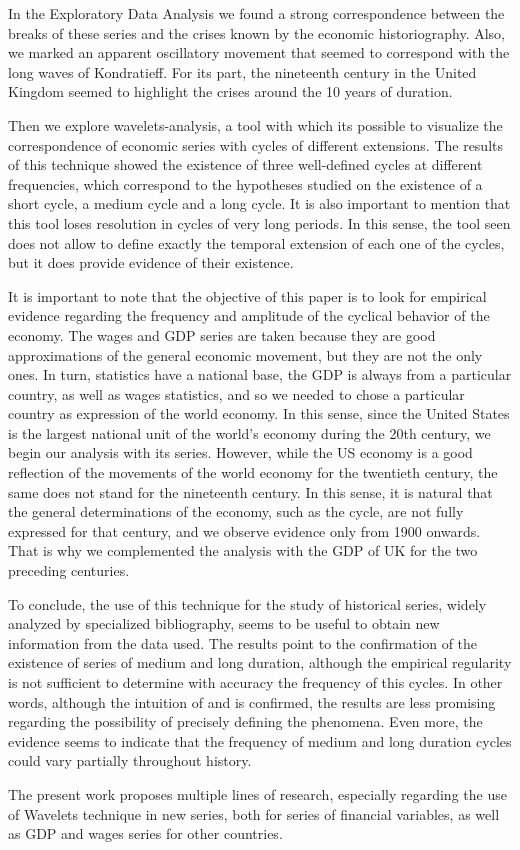 \documentclass[a4paper]{article}
\begin{document}
In the Exploratory Data Analysis we found a strong correspondence between the breaks of these series and the crises known by the economic historiography. Also, we marked an apparent oscillatory movement that seemed to correspond with the long waves of Kondratieff. For its part, the nineteenth century in the United Kingdom seemed to highlight the crises around the 10 years of duration.

Then we explore wavelets-analysis, a tool with which its possible to visualize the correspondence of economic series with cycles of different extensions. The results of this technique showed the existence of three well-defined cycles at different frequencies, which correspond to the hypotheses studied on the existence of a short cycle, a medium cycle and a long cycle. It is also important to mention that this tool loses resolution in cycles of very long periods. In this sense, the tool seen does not allow to define exactly the temporal extension of each one of the cycles, but it does provide evidence of their existence.

It is important to note that the objective of this paper is to look for empirical evidence regarding the frequency and amplitude of the cyclical behavior of the economy. The wages and GDP series are taken because they are good approximations of the general economic movement, but they are not the only ones. In turn, statistics have a national base, the GDP is always from a particular country, as well as wages statistics, and so we needed to chose a particular country as expression of the world economy. In this sense, since the United States is the largest national unit of the world's economy during the 20th century, we begin our analysis with its series. However, while the US economy is a good reflection of the movements of the world economy for the twentieth century, the same does not stand for the nineteenth century. In this sense, it is natural that the general determinations of the economy, such as the cycle, are not fully expressed for that century, and we observe evidence only from 1900 onwards. That is why we complemented the analysis with the GDP of UK for the two preceding centuries.

To conclude, the use of this technique for the study of historical series, widely analyzed by specialized bibliography, seems to be useful to obtain new information from the data used. The results point to the confirmation of the existence of series of medium and long duration, although the empirical regularity is not sufficient to determine with accuracy the frequency of this cycles. In other words, although the intuition of \cite{kuznets1930secular} and \cite{kondratieff1979long} is confirmed, the results are less promising regarding the possibility of precisely defining the phenomena. Even more, the evidence seems to indicate that the frequency of medium and long duration cycles could vary partially throughout history.

The present work proposes multiple lines of research, especially regarding the use of Wavelets technique in new series, both for series of financial variables, as well as GDP and wages series for other countries.


\end{document}
